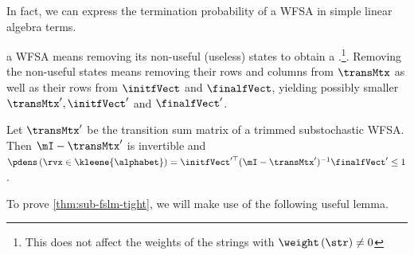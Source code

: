 In fact, we can express the termination probability of a WFSA in simple linear algebra terms.

\begin{definition} \label{def:trim}
 a WFSA means removing its non-useful (useless) states to obtain a .\footnote{This does not affect the weights of the strings with $\weight\left(\str\right) \neq 0$}.  
Removing the non-useful states means removing their rows and columns from $\transMtx$ as well as their rows from $\initfVect$ and $\finalfVect$, yielding possibly smaller $\transMtx', \initfVect'$ and $\finalfVect'$.
\end{definition} 

\begin{theorem} \label{thm:sub-fslm-tight}
Let $\transMtx'$ be the transition sum matrix of a trimmed substochastic WFSA.  
Then $\mI-\transMtx'$ is invertible and $\pdens\left(\rvx \in \kleene{\alphabet}\right)=\initfVect'^\top (\mI-\transMtx')^{-1} \finalfVect' \leq 1$.
\end{theorem}

To prove \cref{thm:sub-fslm-tight}, we will make use of the following useful lemma.

